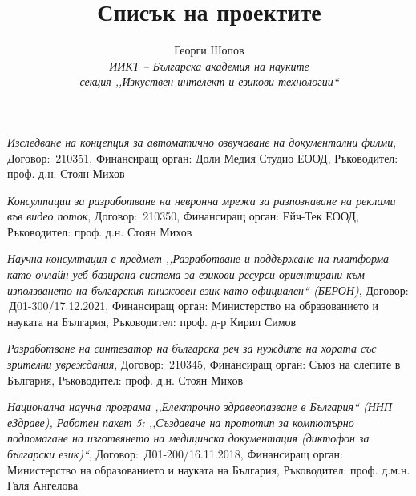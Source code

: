 \documentclass[a4paper,12pt]{article}
\title{\textbf{Списък на проектите}}
\date{}
\author{
	Георги Шопов \\
	\textit{ИИКТ -- Българска академия на науките} \\
	\textit{секция ,,Изкуствен интелект и езикови технологии``}
}
\begin{document}
	\maketitle
	\begin{description}[leftmargin=!,labelwidth=\widthof{\textbf{2021--2023 г.}},align=right]
		\item[\textbf{2023 г.}] \emph{Изследване на концепция за автоматично озвучаване на документални филми}, Договор: \textnumero\,210351, Финансиращ орган: Доли Медия Студио ЕООД, Ръководител: проф. д.н. Стоян Михов
		\item[\textbf{2023 г.}] \emph{Консултации за разработване на невронна мрежа за разпознаване на реклами във видео поток}, Договор: \textnumero\,210350, Финансиращ орган: Ейч-Тек ЕООД, Ръководител: проф. д.н. Стоян Михов
		\item[\textbf{2021--2023 г.}] \emph{Научна консултация с предмет ,,Разработване и поддържане на платформа като онлайн уеб-базирана система за езикови ресурси ориентирани към използването на българския книжовен език като официален`` (БЕРОН)}, Договор: \textnumero\,Д01-300/17.12.2021, Финансиращ орган: Министерство на образованието и науката на България, Ръководител: проф. д-р Кирил Симов
		\item[\textbf{2021--2022 г.}] \emph{Разработване на синтезатор на българска реч за нуждите на хората със зрителни увреждания}, Договор: \textnumero\,210345, Финансиращ орган: Съюз на слепите в България, Ръководител: проф. д.н. Стоян Михов
		\item[\textbf{2018--2022 г.}] \emph{Национална научна програма ,,Електронно здравеопазване в България`` (ННП еЗдраве), Работен пакет 5: ,,Създаване на прототип за компютърно подпомагане на изготвянето на медицинска документация (диктофон за български език)``}, Договор: \textnumero\,Д01-200/16.11.2018, Финансиращ орган: Министерство на образованието и науката на България, Ръководител: проф. д.м.н. Галя Ангелова
	\end{description}
\end{document}
